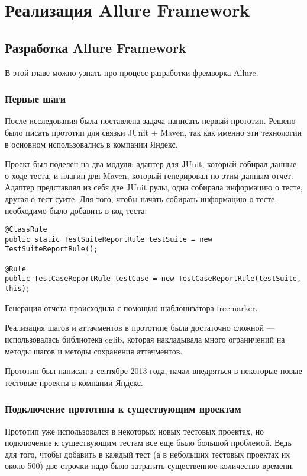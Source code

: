 \chapter{Реализация Allure Framework} 
\label{chapter3}

\section{Разработка Allure Framework}

В этой главе можно узнать про процесс разработки фремворка Allure.

\subsection{Первые шаги}

После исследования была поставлена задача написать первый прототип. Решено было писать прототип для связки JUnit + Maven, так как именно эти технологии в основном использовались в компании Яндекс. 

Проект был поделен на два модуля: адаптер для JUnit, который собирал данные о ходе теста, и плагин для Maven, который генерировал по этим данным отчет. Адаптер представлял из себя две JUnit рулы, одна собирала информацию о тесте, другая о тест суите. Для того, чтобы начать собирать информацию о тесте, необходимо было добавить в код теста:

\begin{lstlisting}
@ClassRule
public static TestSuiteReportRule testSuite = new TestSuiteReportRule();

@Rule
public TestCaseReportRule testCase = new TestCaseReportRule(testSuite, this);
\end{lstlisting}


Генерация отчета происходила с помощью шаблонизатора freemarker. 

Реализация шагов и аттачментов в прототипе была достаточно сложной --- использовалась библиотека cglib, которая накладывала много ограничений на методы шагов и методы сохранения аттачментов.

Прототип был написан в сентябре 2013 года, начал внедряться в некоторые новые тестовые проекты в компании Яндекс.

\subsection{Подключение прототипа к существующим проектам}

Прототип уже использовался в некоторых новых тестовых проектах, но подключение к существующим тестам все еще было большой проблемой. Ведь для того, чтобы добавить в каждый тест (а в небольших тестовых проектах их около 500) две строчки надо было затратить существенное количество времени. 

